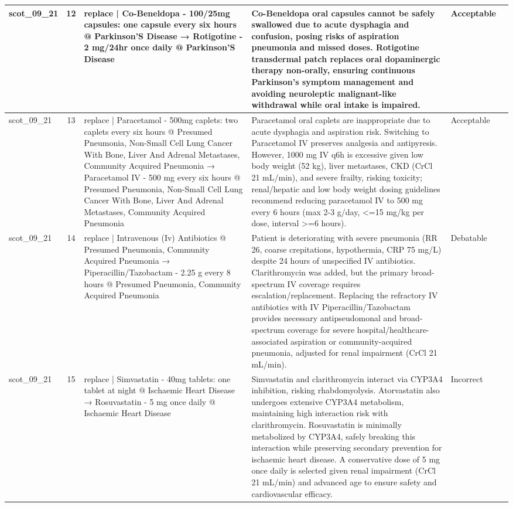\begin{longtable}{|p{1.45cm}|c|p{3.3cm}|p{6.5cm}|p{1.55cm}|p{2.3cm}|}
\hline
scot\_09\_21 & 12 & replace | Co-Beneldopa - 100/25mg capsules: one capsule every six hours @ Parkinson’S Disease → Rotigotine - 2 mg/24hr once daily @ Parkinson’S Disease & Co-Beneldopa oral capsules cannot be safely swallowed due to acute dysphagia and confusion, posing risks of aspiration pneumonia and missed doses. Rotigotine transdermal patch replaces oral dopaminergic therapy non-orally, ensuring continuous Parkinson's symptom management and avoiding neuroleptic malignant-like withdrawal while oral intake is impaired. & Acceptable &  \\
\hline
scot\_09\_21 & 13 & replace | Paracetamol - 500mg caplets: two caplets every six hours @ Presumed Pneumonia, Non-Small Cell Lung Cancer With Bone, Liver And Adrenal Metastases, Community Acquired Pneumonia → Paracetamol IV - 500 mg every six hours @ Presumed Pneumonia, Non-Small Cell Lung Cancer With Bone, Liver And Adrenal Metastases, Community Acquired Pneumonia & Paracetamol oral caplets are inappropriate due to acute dysphagia and aspiration risk. Switching to Paracetamol IV preserves analgesia and antipyresis. However, 1000 mg IV q6h is excessive given low body weight (52 kg), liver metastases, CKD (CrCl 21 mL/min), and severe frailty, risking toxicity; renal/hepatic and low body weight dosing guidelines recommend reducing paracetamol IV to 500 mg every 6 hours (max 2-3 g/day, <=15 mg/kg per dose, interval >=6 hours). & Acceptable &  \\
\hline
scot\_09\_21 & 14 & replace | Intravenous (Iv) Antibiotics @ Presumed Pneumonia, Community Acquired Pneumonia → Piperacillin/Tazobactam - 2.25 g every 8 hours @ Presumed Pneumonia, Community Acquired Pneumonia & Patient is deteriorating with severe pneumonia (RR 26, coarse crepitations, hypothermia, CRP 75 mg/L) despite 24 hours of unspecified IV antibiotics. Clarithromycin was added, but the primary broad-spectrum IV coverage requires escalation/replacement. Replacing the refractory IV antibiotics with IV Piperacillin/Tazobactam provides necessary antipseudomonal and broad-spectrum coverage for severe hospital/healthcare-associated aspiration or community-acquired pneumonia, adjusted for renal impairment (CrCl 21 mL/min). & Debatable &  \\
\hline
scot\_09\_21 & 15 & replace | Simvastatin - 40mg tablets: one tablet at night @ Ischaemic Heart Disease → Rosuvastatin - 5 mg once daily @ Ischaemic Heart Disease & Simvastatin and clarithromycin interact via CYP3A4 inhibition, risking rhabdomyolysis. Atorvastatin also undergoes extensive CYP3A4 metabolism, maintaining high interaction risk with clarithromycin. Rosuvastatin is minimally metabolized by CYP3A4, safely breaking this interaction while preserving secondary prevention for ischaemic heart disease. A conservative dose of 5 mg once daily is selected given renal impairment (CrCl 21 mL/min) and advanced age to ensure safety and cardiovascular efficacy. & Incorrect &  \\

\end{longtable}
